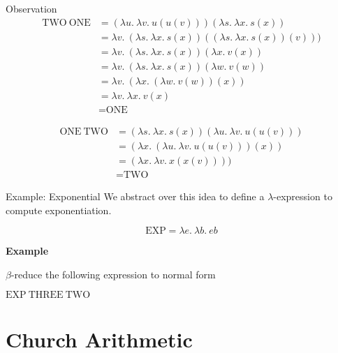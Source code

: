 \documentclass{beamer}
\begin{document}
\begin{frame}{Observation}
    \begin{align*}
        \text{TWO} \ \text{ONE} &= (\lambda u. \ \lambda v. \ u(u(v))) (\lambda s. \ \lambda x. \ s(x)) \\
        &= \lambda v. \ (\lambda s. \ \lambda x. \ s(x))((\lambda s. \ \lambda x. \ s(x))(v))) \\
        &= \lambda v. \ (\lambda s. \ \lambda x. \ s(x))(\lambda x. \ v(x)) \\
        &= \lambda v. \ (\lambda s. \ \lambda x. \ s(x))(\lambda w. \ v(w)) \\
        &= \lambda v. \ (\lambda x. \ (\lambda w. \ v(w))(x)) \\
        &= \lambda v. \ \lambda x. \ v(x) \\
        &= \text{ONE}
    \end{align*}
    
    \begin{align*}
        \text{ONE} \ \text{TWO} &= (\lambda s. \ \lambda x. \ s(x))(\lambda u. \ \lambda v. \ u(u(v))) \\
        &= (\lambda x. \ (\lambda u. \ \lambda v. \ u(u(v)))(x)) \\
        &= (\lambda x. \ \lambda v. \ x(x(v)))) \\
        &= \text{TWO}
    \end{align*}
\end{frame}

\begin{frame}{Example: Exponential}
    We abstract over this idea to define a $\lambda$-expression to compute exponentiation.
    
    $$\text{EXP} = \lambda e. \ \lambda b. \ eb $$
    
    {\bf Example} 
    
    $\beta$-reduce the following expression to normal form
    
    \vspace{0.3cm}
    
    $\text{EXP} \ \text{THREE} \ \text{TWO}$
    \vspace{3cm}
\end{frame}

\section{Church Arithmetic}
\end{document}
